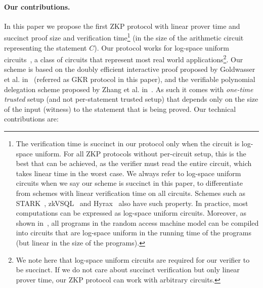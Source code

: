 \paragraph{Our contributions.} In this paper we propose the first ZKP protocol with linear prover time and succinct proof size and verification time\footnote{The verification time is succinct in our protocol only when the circuit is log-space uniform. For all ZKP protocols without per-circuit setup, this is the best that can be achieved, as the verifier must read the entire circuit, which takes linear time in the worst case. We always refer to log-space uniform circuits when we say our scheme is succinct in this paper, to differentiate from schemes with linear verification time on all circuits. Schemes such as STARK~\cite{libstark}, zkVSQL~\cite{zkvpd} and Hyrax~\cite{hyrax} also have such property. In practice, most computations can be expressed as log-space uniform circuits. Moreover, as shown in~\cite{ben2014succinct,vram,libstark}, all programs in the random access machine model can be compiled into circuits that are log-space uniform in the running time of the programs (but linear in the size of the programs).} (in the size of the arithmetic circuit representing the statement $C$). Our protocol works  for log-space uniform circuits~\cite{GKR}, a class of circuits that represent most real world applications\footnote{We note here that log-space uniform circuits are required for our verifier to be succinct. If we do not care about succinct verification but only linear prover time, our ZKP protocol can work with arbitrary circuits. }.  Our scheme is based on the doubly efficient interactive proof proposed by Goldwasser et al. in~\cite{GKR} (referred as GKR protocol in this paper), and the verifiable polynomial delegation scheme proposed by Zhang et al. in~\cite{zhang2017vsql}. As such it comes with \emph{one-time trusted} setup (and not per-statement trusted setup) that depends only on the size of the input (witness) to the statement that is being proved. Our technical  contributions are:
